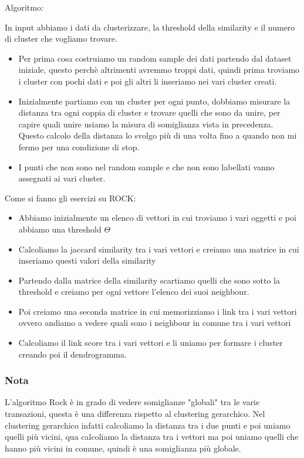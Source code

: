 \documentclass[14pt]{extreport}
\begin{document}
Algoritmo:

In input abbiamo i dati da clusterizzare, la threshold della similarity e il numero di cluster che vogliamo trovare.

\begin{itemize}
    \item Per prima cosa costruiamo un random sample dei dati partendo dal dataset iniziale, questo perchè altrimenti avremmo troppi dati, quindi prima troviamo i cluster con pochi dati e poi gli altri li inseriamo nei vari cluster creati.
    \item Inizialmente partiamo con un cluster per ogni punto, dobbiamo misurare la distanza tra ogni coppia di cluster e trovare quelli che sono da unire, per capire quali unire usiamo la misura di somiglianza vista in precedenza.
    Questo calcolo della distanza lo svolgo più di una volta fino a quando non mi fermo per una condizione di stop.
    \item I punti che non sono nel random sample e che non sono labellati vanno assegnati ai vari cluster.
\end{itemize}

Come si fanno gli esercizi su ROCK:

\begin{itemize}
    \item Abbiamo inizialmente un elenco di vettori in cui troviamo i vari oggetti e poi abbiamo una threshold $\Theta$
    \item Calcoliamo la jaccard similarity tra i vari vettori e creiamo una matrice in cui inseriamo questi valori della similarity
    \item Partendo dalla matrice della similarity scartiamo quelli che sono sotto la threshold e creiamo per ogni vettore l'elenco dei suoi neighbour.
    \item Poi creiamo una seconda matrice in cui memorizziamo i link tra i vari vettori ovvero andiamo a vedere quali sono i neighbour in comune tra i vari vettori
    \item Calcoliamo il link score tra i vari vettori e li uniamo per formare i cluster creando poi il dendrogramma.
\end{itemize}

\subsubsection{Nota}

L'algoritmo Rock è in grado di vedere somiglianze "globali" tra le varie transazioni, questa è una differenza rispetto al clustering gerarchico.
Nel clustering gerarchico infatti calcoliamo la distanza tra i due punti e poi uniamo quelli più vicini, qua calcoliamo la distanza tra i vettori ma poi uniamo quelli che hanno più vicini in comune, quindi è una somiglianza più globale.
\end{document}
